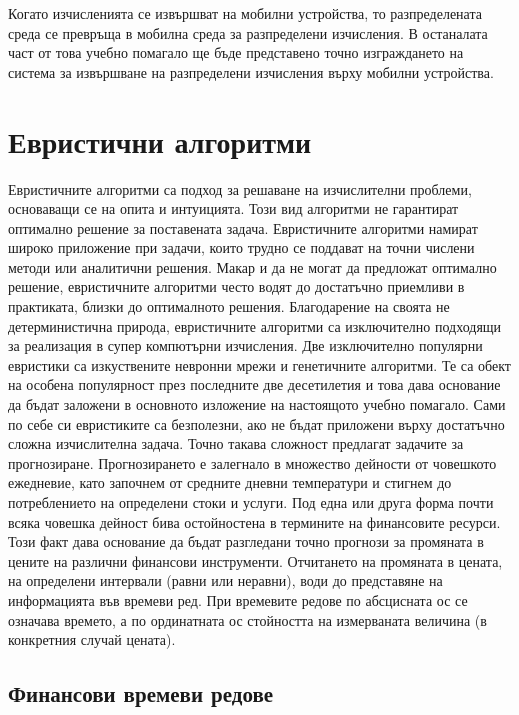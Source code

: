 \documentclass[book,14pt,oneside,openany]{memoir}
\begin{document}
Когато изчисленията се извършват на мобилни устройства, то разпределената среда се превръща в мобилна среда за разпределени изчисления. В останалата част от това учебно помагало ще бъде представено точно изграждането на система за извършване на разпределени изчисления върху мобилни устройства. 

\newpage
\chapter{Евристични алгоритми}

Евристичните алгоритми са подход за решаване на изчислителни проблеми, основаващи се на опита и интуицията. Този вид алгоритми не гарантират оптимално решение за поставената задача. Евристичните алгоритми намират широко приложение при задачи, които трудно се поддават на точни числени методи или аналитични решения. Макар и да не могат да предложат оптимално решение, евристичните алгоритми често водят до достатъчно приемливи в практиката, близки до оптималното решения. Благодарение на своята не детерминистична природа, евристичните алгоритми са изключително подходящи за реализация в супер компютърни изчисления. Две изключително популярни евристики са изкуствените невронни мрежи и генетичните алгоритми. Те са обект на особена популярност през последните две десетилетия и това дава основание да бъдат заложени в основното изложение на настоящото учебно помагало. Сами по себе си евристиките са безполезни, ако не бъдат приложени върху достатъчно сложна изчислителна задача. Точно такава сложност предлагат задачите за прогнозиране. Прогнозирането е залегнало в множество дейности от човешкото ежедневие, като започнем от средните дневни температури и стигнем до потреблението на определени стоки и услуги. Под една или друга форма почти всяка човешка дейност бива остойностена в термините на финансовите ресурси. Този факт дава основание да бъдат разгледани точно прогнози за промяната в цените на различни финансови инструменти. Отчитането на промяната в цената, на определени интервали (равни или неравни), води до представяне на информацията във времеви ред. При времевите редове по абсцисната ос се означава времето, а по ординатната ос стойността на измерваната величина (в конкретния случай цената).

\section{Финансови времеви редове}
\end{document}
